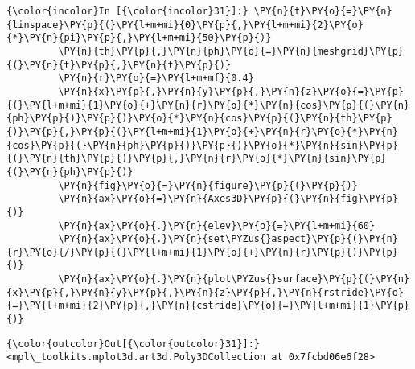     \begin{Verbatim}[commandchars=\\\{\}]
{\color{incolor}In [{\color{incolor}31}]:} \PY{n}{t}\PY{o}{=}\PY{n}{linspace}\PY{p}{(}\PY{l+m+mi}{0}\PY{p}{,}\PY{l+m+mi}{2}\PY{o}{*}\PY{n}{pi}\PY{p}{,}\PY{l+m+mi}{50}\PY{p}{)}
         \PY{n}{th}\PY{p}{,}\PY{n}{ph}\PY{o}{=}\PY{n}{meshgrid}\PY{p}{(}\PY{n}{t}\PY{p}{,}\PY{n}{t}\PY{p}{)}
         \PY{n}{r}\PY{o}{=}\PY{l+m+mf}{0.4}
         \PY{n}{x}\PY{p}{,}\PY{n}{y}\PY{p}{,}\PY{n}{z}\PY{o}{=}\PY{p}{(}\PY{l+m+mi}{1}\PY{o}{+}\PY{n}{r}\PY{o}{*}\PY{n}{cos}\PY{p}{(}\PY{n}{ph}\PY{p}{)}\PY{p}{)}\PY{o}{*}\PY{n}{cos}\PY{p}{(}\PY{n}{th}\PY{p}{)}\PY{p}{,}\PY{p}{(}\PY{l+m+mi}{1}\PY{o}{+}\PY{n}{r}\PY{o}{*}\PY{n}{cos}\PY{p}{(}\PY{n}{ph}\PY{p}{)}\PY{p}{)}\PY{o}{*}\PY{n}{sin}\PY{p}{(}\PY{n}{th}\PY{p}{)}\PY{p}{,}\PY{n}{r}\PY{o}{*}\PY{n}{sin}\PY{p}{(}\PY{n}{ph}\PY{p}{)}
         \PY{n}{fig}\PY{o}{=}\PY{n}{figure}\PY{p}{(}\PY{p}{)}
         \PY{n}{ax}\PY{o}{=}\PY{n}{Axes3D}\PY{p}{(}\PY{n}{fig}\PY{p}{)}
         \PY{n}{ax}\PY{o}{.}\PY{n}{elev}\PY{o}{=}\PY{l+m+mi}{60}
         \PY{n}{ax}\PY{o}{.}\PY{n}{set\PYZus{}aspect}\PY{p}{(}\PY{n}{r}\PY{o}{/}\PY{p}{(}\PY{l+m+mi}{1}\PY{o}{+}\PY{n}{r}\PY{p}{)}\PY{p}{)}
         \PY{n}{ax}\PY{o}{.}\PY{n}{plot\PYZus{}surface}\PY{p}{(}\PY{n}{x}\PY{p}{,}\PY{n}{y}\PY{p}{,}\PY{n}{z}\PY{p}{,}\PY{n}{rstride}\PY{o}{=}\PY{l+m+mi}{2}\PY{p}{,}\PY{n}{cstride}\PY{o}{=}\PY{l+m+mi}{1}\PY{p}{)}
\end{Verbatim}

            \begin{Verbatim}[commandchars=\\\{\}]
{\color{outcolor}Out[{\color{outcolor}31}]:} <mpl\_toolkits.mplot3d.art3d.Poly3DCollection at 0x7fcbd06e6f28>
\end{Verbatim}
        
    \begin{center}
    \end{center}
    { \hspace*{\fill} \\}
